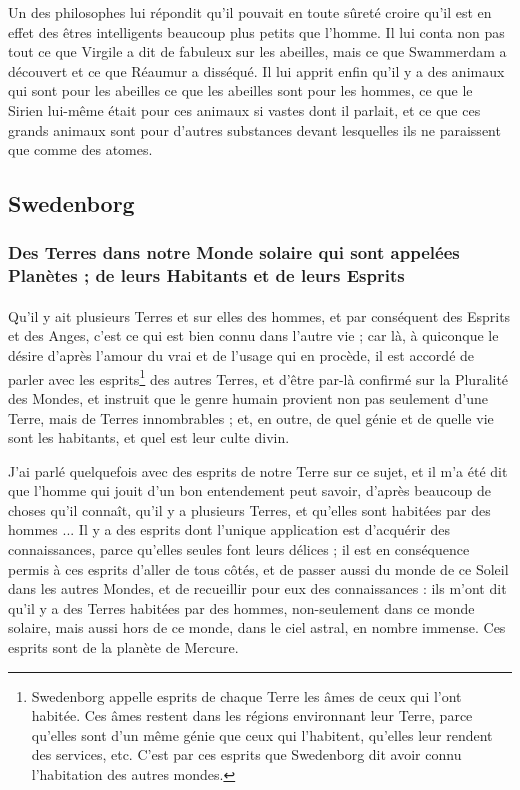 \documentclass[a4paper, 11pt, oneside]{article}
\begin{document}
Un des philosophes lui répondit qu'il pouvait en toute sûreté croire qu'il est en effet des êtres intelligents beaucoup plus petits que l'homme. Il lui conta non pas tout ce que Virgile a dit de fabuleux sur les abeilles, mais ce que Swammerdam a découvert et ce que Réaumur a disséqué. Il lui apprit enfin qu'il y a des animaux qui sont pour les abeilles ce que les abeilles sont pour les hommes, ce que le Sirien lui-même était pour ces animaux si vastes dont il parlait, et ce que ces grands animaux sont pour d'autres substances devant lesquelles ils ne paraissent que comme des atomes.
\clearpage
\subsection{Swedenborg}
\subsubsection{Des Terres dans notre Monde solaire qui sont appelées Planètes ; de leurs Habitants et de leurs Esprits}
\paragraph{}
Qu'il y ait plusieurs Terres et sur elles des hommes, et par conséquent des Esprits et des Anges, c'est ce qui est bien connu dans l'autre vie ; car là, à quiconque le désire d'après l'amour du vrai et de l'usage qui en procède, il est accordé de parler avec les esprits\footnote{Swedenborg appelle esprits de chaque Terre les âmes de ceux qui l'ont habitée. Ces âmes restent dans les régions environnant leur Terre, parce qu'elles sont d'un même génie que ceux qui l'habitent, qu'elles leur rendent des services, etc. C'est par ces esprits que Swedenborg dit avoir connu l'habitation des autres mondes.} des autres Terres, et d'être par-là confirmé sur la Pluralité des Mondes, et instruit que le genre humain provient non pas seulement d'une Terre, mais de Terres innombrables ; et, en outre, de quel génie et de quelle vie sont les habitants, et quel est leur culte divin.

J'ai parlé quelquefois avec des esprits de notre Terre sur ce sujet, et il m'a été dit que l'homme qui jouit d'un bon entendement peut savoir, d'après beaucoup de choses qu'il connaît, qu'il y a plusieurs Terres, et qu'elles sont habitées par des hommes ... Il y a des esprits dont l'unique application est d'acquérir des connaissances, parce qu'elles seules font leurs délices ; il est en conséquence permis à ces esprits d'aller de tous côtés, et de passer aussi du monde de ce Soleil dans les autres Mondes, et de recueillir pour eux des connaissances : ils m'ont dit qu'il y a des Terres habitées par des hommes, non-seulement dans ce monde solaire, mais aussi hors de ce monde, dans le ciel astral, en nombre immense. Ces esprits sont de la planète de Mercure.
\end{document}
